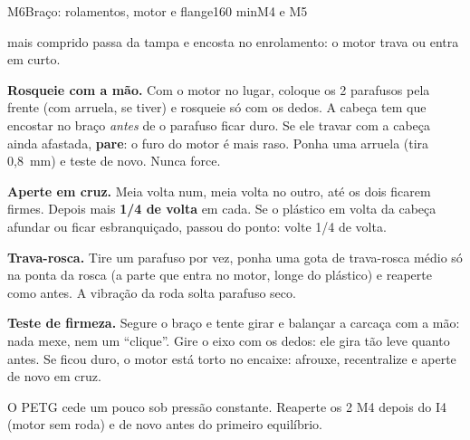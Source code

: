 \documentclass[11pt,a4paper]{article}
\begin{document}
\begin{tarefa}{M6}{Braço: rolamentos, motor e flange}{1}{60 min}{M4 e M5}
\begin{passos}
    mais comprido passa da tampa e encosta no enrolamento: o motor trava ou entra em curto.
  \item \textbf{Rosqueie com a mão.} Com o motor no lugar, coloque os 2 parafusos pela frente
    (com arruela, se tiver) e rosqueie só com os dedos. A cabeça tem que encostar no braço
    \emph{antes} de o parafuso ficar duro. Se ele travar com a cabeça ainda afastada,
    \textbf{pare}: o furo do motor é mais raso. Ponha uma arruela (tira 0,8~mm) e teste de
    novo. Nunca force.
  \item \textbf{Aperte em cruz.} Meia volta num, meia volta no outro, até os dois ficarem
    firmes. Depois mais \textbf{1/4 de volta} em cada. Se o plástico em volta da cabeça
    afundar ou ficar esbranquiçado, passou do ponto: volte 1/4 de volta.
  \item \textbf{Trava-rosca.} Tire um parafuso por vez, ponha uma gota de trava-rosca médio
    só na ponta da rosca (a parte que entra no motor, longe do plástico) e reaperte como
    antes. A vibração da roda solta parafuso seco.
  \item \textbf{Teste de firmeza.} Segure o braço e tente girar e balançar a carcaça com a
    mão: nada mexe, nem um ``clique''. Gire o eixo com os dedos: ele gira tão leve quanto
    antes. Se ficou duro, o motor está torto no encaixe: afrouxe, recentralize e aperte de
    novo em cruz.
\end{passos}
O PETG cede um pouco sob pressão constante. Reaperte os 2 M4 depois do I4 (motor sem roda) e
de novo antes do primeiro equilíbrio.


\end{tarefa}
\end{document}
